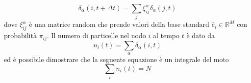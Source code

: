 \documentclass[../main.tex]{subfiles}
\begin{document}
\begin{equation}
    \delta_\alpha(i,t+\Delta t)=\sum_j\xi_{ij}^\alpha\delta_\alpha(j,t)
\end{equation}
dove $\xi_{ij}^\alpha$ \`e una matrice random che prende valori della base standard $\widehat{e}_i\in \mathbb{R}^M$ con probabilità $\pi_{ij}$.
Il numero di particelle nel nodo $i$ al tempo $t$ \`e dato da
\begin{equation}
    n_i(t)=\sum_\alpha\delta_\alpha(i,t)
\end{equation}
ed \`e possibile dimostrare \cite{RandomWalks} che la seguente equazione \`e un integrale del moto
\begin{equation}
    \sum_in_i(t)=N
\end{equation}
\end{document}
